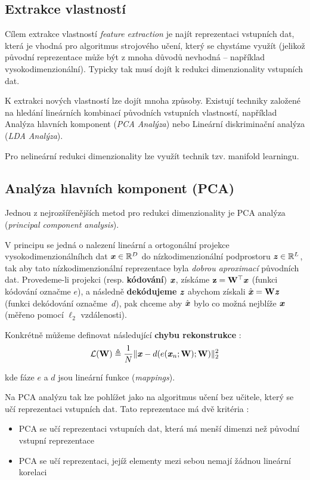 \subsection{Extrakce vlastností}
Cílem extrakce vlastností \emph{feature extraction} je najít reprezentaci vstupních dat, která je vhodná pro algoritmus strojového učení, který se chystáme využít (jelikož původní reprezentace může být z mnoha důvodů nevhodná – například vysokodimenzionální).
Typicky tak musí dojít k redukci dimenzionality vstupních dat. \cite{Liu1998}

K extrakci nových vlastností lze dojít mnoha způsoby.
Existují techniky založené na hledání lineárních kombinací původních vstupních vlastností, například Analýza hlavních komponent (\emph{PCA Analýza}) nebo Lineární diskriminační analýza (\emph{LDA Analýza}).

Pro nelineární redukci dimenzionality lze využít technik tzv. manifold learningu.


\subsection{Analýza hlavních komponent (PCA)}
\label{sec:pca}
Jednou z nejrozšířenějších metod pro redukci dimenzionality je PCA analýza (\emph{principal component analysis}).

V principu se jedná o nalezení lineární a ortogonální projekce vysokodimenzionálníhch dat $\textbf{\emph{x}} \in \mathbb{R}^D$ do nízkodimenzionální podprostoru  $\textbf{\emph{z}} \in \mathbb{R}^L$,
tak aby tato nízkodimenzionální reprezentace byla \emph{dobrou aproximací} původních dat.
Provedeme-li projekci (resp. \textbf{kódování}) $\textbf{\emph{x}}$, získáme $\mathbf{z} = \mathbf{W^{\top}} \textbf{\emph{x}}$ (funkci kódování označme $e$),
a následně \textbf{dekódujeme} $\textbf{\emph{z}}$ abychom získali $\hat{\textbf{\emph{x}}} = \mathbf{W}\textbf{\emph{z}}$ (funkci dekódování označme $d$),
pak chceme aby $\hat{\textbf{\emph{x}}}$ bylo co možná nejblíže $\textbf{\emph{x}}$ (měřeno pomocí $\ell_2$ vzdálenosti). \cite{Murphy2022}

Konkrétně můžeme definovat následující \textbf{chybu rekonstrukce} \cite{Murphy2022}:
\begin{equation}
    \mathcal{L}(\mathbf{W}) \triangleq \frac{1}{N} \| \textbf{\emph{x}} - d(e(\textbf{\emph{x}}_n; \mathbf{W}); \mathbf{W})\|^2_2
\end{equation}

kde fáze $e$ a $d$ jsou lineární funkce (\emph{mappings}).

Na PCA analýzu tak lze pohlížet jako na algoritmus učení bez učitele, který se učí reprezentaci vstupních dat. Tato reprezentace má dvě kritéria \cite{Goodfellow2016}:

\begin{itemize}
    \item PCA se učí reprezentaci vstupních dat, která má menší dimenzi než původní vstupní reprezentace
    \item PCA se učí reprezentaci, jejíž elementy mezi sebou nemají žádnou lineární korelaci
\end{itemize}
